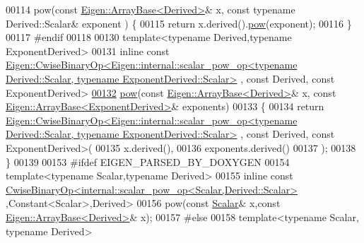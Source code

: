 \begin{DoxyCode}
00114   pow(\textcolor{keyword}{const} \hyperlink{group___core___module_class_eigen_1_1_array_base}{Eigen::ArrayBase<Derived>}& x, \textcolor{keyword}{const} \textcolor{keyword}{typename} Derived::Scalar& exponent
      ) \{
00115     \textcolor{keywordflow}{return} x.derived().\hyperlink{group___core___module_ab6dc101d82e8228a19a8840e3a29c1c9}{pow}(exponent);
00116   \}
00117 \textcolor{preprocessor}{#endif}
00118 
00130   \textcolor{keyword}{template}<\textcolor{keyword}{typename} Derived,\textcolor{keyword}{typename} ExponentDerived>
00131   \textcolor{keyword}{inline} \textcolor{keyword}{const} 
      \hyperlink{group___core___module_class_eigen_1_1_cwise_binary_op}{Eigen::CwiseBinaryOp<Eigen::internal::scalar\_pow\_op<typename Derived::Scalar, typename
       ExponentDerived::Scalar>}
      , \textcolor{keyword}{const} Derived, \textcolor{keyword}{const} ExponentDerived>
\hyperlink{group___core___module_acb769e1ab1d809abb77c7ab98021ad81}{00132}   \hyperlink{group___core___module_acb769e1ab1d809abb77c7ab98021ad81}{pow}(\textcolor{keyword}{const} \hyperlink{group___core___module_class_eigen_1_1_array_base}{Eigen::ArrayBase<Derived>}& x, \textcolor{keyword}{const} 
      \hyperlink{group___core___module_class_eigen_1_1_array_base}{Eigen::ArrayBase<ExponentDerived>}& exponents) 
00133   \{
00134     \textcolor{keywordflow}{return} 
      \hyperlink{group___core___module_class_eigen_1_1_cwise_binary_op}{Eigen::CwiseBinaryOp<Eigen::internal::scalar\_pow\_op<typename Derived::Scalar, typename
       ExponentDerived::Scalar>}
      , \textcolor{keyword}{const} Derived, \textcolor{keyword}{const} ExponentDerived>(
00135       x.derived(),
00136       exponents.derived()
00137     );
00138   \}
00139   
00153 \textcolor{preprocessor}{#ifdef EIGEN\_PARSED\_BY\_DOXYGEN}
00154   \textcolor{keyword}{template}<\textcolor{keyword}{typename} Scalar,\textcolor{keyword}{typename} Derived>
00155   \textcolor{keyword}{inline} \textcolor{keyword}{const} \hyperlink{group___core___module_class_eigen_1_1_cwise_binary_op}{CwiseBinaryOp<internal::scalar\_pow\_op<Scalar,Derived::Scalar>}
      ,Constant<Scalar>,Derived>
00156   pow(\textcolor{keyword}{const} \hyperlink{group___core___module_a5feed465b3a8e60c47e73ecce83e39a2}{Scalar}& x,\textcolor{keyword}{const} \hyperlink{group___core___module_class_eigen_1_1_array_base}{Eigen::ArrayBase<Derived>}& x);
00157 \textcolor{preprocessor}{#else}
00158   \textcolor{keyword}{template}<\textcolor{keyword}{typename} Scalar, \textcolor{keyword}{typename} Derived>

\end{DoxyCode}
